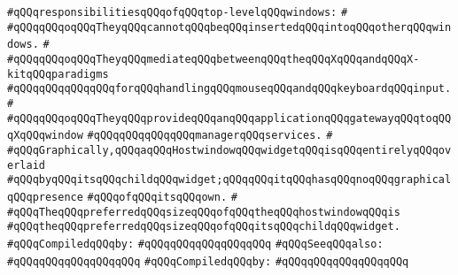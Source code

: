 \verb|#qQQqresponsibilitiesqQQqofqQQqtop-levelqQQqwindows:|\newline
\verb|#|\newline
\verb|#qQQqqQQqoqQQqTheyqQQqcannotqQQqbeqQQqinsertedqQQqintoqQQqotherqQQqwindows.|\newline
\verb|#|\newline
\verb|#qQQqqQQqoqQQqTheyqQQqmediateqQQqbetweenqQQqtheqQQqXqQQqandqQQqX-kitqQQqparadigms|\newline
\verb|#qQQqqQQqqQQqqQQqforqQQqhandlingqQQqmouseqQQqandqQQqkeyboardqQQqinput.|\newline
\verb|#|\newline
\verb|#qQQqqQQqoqQQqTheyqQQqprovideqQQqanqQQqapplicationqQQqgatewayqQQqtoqQQqXqQQqwindow|\newline
\verb|#qQQqqQQqqQQqqQQqmanagerqQQqservices.|\newline
\verb|#|\newline
\verb|#qQQqGraphically,qQQqaqQQqHostwindowqQQqwidgetqQQqisqQQqentirelyqQQqoverlaid|\newline
\verb|#qQQqbyqQQqitsqQQqchildqQQqwidget;qQQqqQQqitqQQqhasqQQqnoqQQqgraphicalqQQqpresence|\newline
\verb|#qQQqofqQQqitsqQQqown.|\newline
\verb|#|\newline
\verb|#qQQqTheqQQqpreferredqQQqsizeqQQqofqQQqtheqQQqhostwindowqQQqis|\newline
\verb|#qQQqtheqQQqpreferredqQQqsizeqQQqofqQQqitsqQQqchildqQQqwidget.|\newline
\newline
\verb|#qQQqCompiledqQQqby:|\newline
\verb|#qQQqqQQqqQQqqQQqqQQq|\newline
\newline
\verb|#qQQqSeeqQQqalso:|\newline
\verb|#qQQqqQQqqQQqqQQqqQQq|\newline
\newline
\verb|#qQQqCompiledqQQqby:|\newline
\verb|#qQQqqQQqqQQqqQQqqQQq|\newline
\newline
\newline
